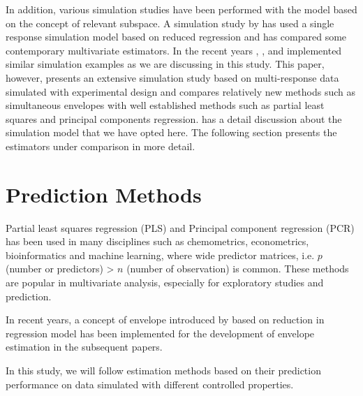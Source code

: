 \documentclass[12pt,3p,authoryear]{elsarticle}
\begin{document}
In addition, various simulation studies have been performed with the
model based on the concept of relevant subspace. A simulation study by
\citet{Alm_y_1996} has used a single response simulation model based on
reduced regression and has compared some contemporary multivariate
estimators. In the recent years \citet{helland2012near},
\citet{saebo2015simrel}, \citet{helland2016algorithms} and
\citet{Rimal2018} implemented similar simulation examples as we are
discussing in this study. This paper, however, presents an extensive
simulation study based on multi-response data simulated with
experimental design and compares relatively new methods such as
simultaneous envelopes with well established methods such as partial
least squares and principal components regression. \citet{Rimal2018} has
a detail discussion about the simulation model that we have opted here.
The following section presents the estimators under comparison in more
detail.

\section{Prediction Methods}\label{prediction-methods}

Partial least squares regression (PLS) and Principal component
regression (PCR) has been used in many disciplines such as chemometrics,
econometrics, bioinformatics and machine learning, where wide predictor
matrices, i.e. \(p\) (number or predictors) \textgreater{} \(n\) (number
of observation) is common. These methods are popular in multivariate
analysis, especially for exploratory studies and prediction.

In recent years, a concept of envelope introduced by \citet{Cook2007a}
based on reduction in regression model has been implemented for the
development of envelope estimation in the subsequent papers.

In this study, we will follow estimation methods based on their
prediction performance on data simulated with different controlled
properties.
\end{document}

